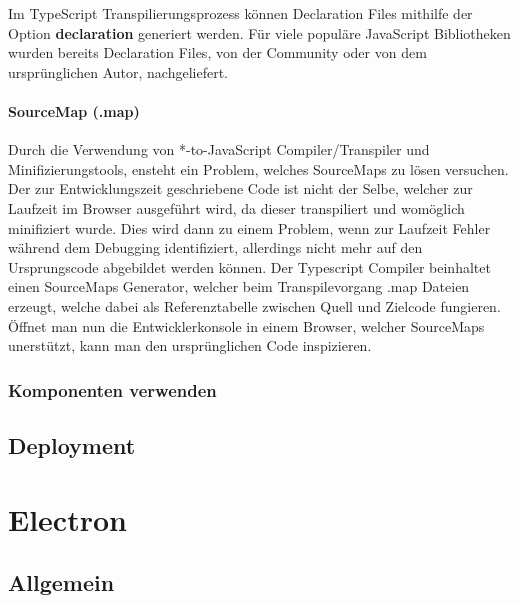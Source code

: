 Im TypeScript Transpilierungsprozess können Declaration Files mithilfe der Option \textbf{declaration} generiert werden.
Für viele populäre JavaScript Bibliotheken wurden bereits Declaration Files, von der Community oder von dem ursprünglichen Autor, nachgeliefert.
\cite[471]{EssentialTS}

\paragraph{SourceMap (.map)}

Durch die Verwendung von *-to-JavaScript Compiler/Transpiler und Minifizierungstools, ensteht ein Problem, welches SourceMaps zu lösen versuchen.
Der zur Entwicklungszeit geschriebene Code ist nicht der Selbe, welcher zur Laufzeit im Browser ausgeführt wird, da dieser transpiliert und womöglich minifiziert wurde.
Dies wird dann zu einem Problem, wenn zur Laufzeit Fehler während dem Debugging identifiziert, allerdings nicht mehr auf den Ursprungscode abgebildet werden
können. Der Typescript Compiler beinhaltet einen SourceMaps Generator, welcher beim Transpilevorgang .map Dateien erzeugt, welche dabei als Referenztabelle zwischen Quell und Zielcode fungieren.
Öffnet man nun die Entwicklerkonsole in einem Browser, welcher SourceMaps unerstützt, kann man den ursprünglichen Code inspizieren.
\cite{Using97:online}

\subsubsection{Komponenten verwenden}


\subsection{Deployment}

\section{Electron}
\subsection{Allgemein}
